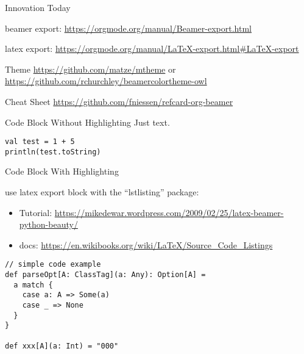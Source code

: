 \documentclass[10pt, presentation]{beamer}
\begin{document}
\begin{frame}[label={sec:org7325bcc}]{Innovation Today}
\begin{block}{beamer export: \url{https://orgmode.org/manual/Beamer-export.html}}
\end{block}

\begin{block}{latex export: \url{https://orgmode.org/manual/LaTeX-export.html\#LaTeX-export}}
\end{block}

\begin{block}{Theme \url{https://github.com/matze/mtheme}  or  \url{https://github.com/rchurchley/beamercolortheme-owl}}
\end{block}

\begin{block}{Cheat Sheet  \url{https://github.com/fniessen/refcard-org-beamer}}
\end{block}

\end{frame}


\begin{frame}[label={sec:orgd268d6b},fragile]{Code Block Without Highlighting}
 Just text.

\begin{verbatim}
val test = 1 + 5
println(test.toString)
\end{verbatim}

\end{frame}

\begin{frame}[label={sec:org7dbd86c}]{Code Block With Highlighting}
\begin{block}{use latex export block with the ``lstlisting'' package:}
\begin{itemize}
\item Tutorial: \url{https://mikedewar.wordpress.com/2009/02/25/latex-beamer-python-beauty/}
\item docs: \url{https://en.wikibooks.org/wiki/LaTeX/Source\_Code\_Listings}
\end{itemize}


\begin{lstlisting}
// simple code example
def parseOpt[A: ClassTag](a: Any): Option[A] =
  a match {
    case a: A => Some(a)
    case _ => None
  }
}

def xxx[A](a: Int) = "000"
\end{lstlisting}
\end{block}
\end{frame}
\end{document}
